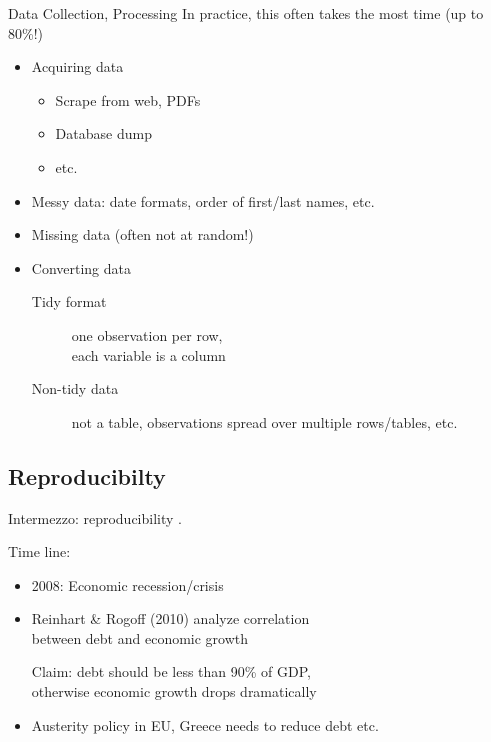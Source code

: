 \documentclass[aspectratio=169,usenames,dvipsnames]{beamer}
\begin{document}
\begin{frame}{Data Collection, Processing}
In practice, this often takes the most time (up to 80\%!)

\begin{itemize}
    \item Acquiring data
        \begin{itemize}
            \item Scrape from web, PDFs
            \item Database dump
            \item etc.
        \end{itemize}
    \pause
    \item Messy data: date formats, order of first/last names, etc.
    \item Missing data (often not at random!)
    \pause
    \item Converting data
        \begin{description}
            \item[Tidy format] one observation per row, \\
                    each variable is a column
            \item[Non-tidy data] not a table, observations spread over multiple
                rows/tables, etc.
        \end{description}
\end{itemize}
\end{frame}




\subsection{Reproducibilty}
\frame{\tableofcontents[currentsubsection]}

\begin{frame}{Intermezzo: reproducibility}
    .

    Time line:
    \begin{itemize}
        \item 2008: Economic recession/crisis
        \item Reinhart \& Rogoff (2010) analyze correlation \\
            between debt and economic growth \\
            \begin{block}{Claim:}
            debt should be less than 90\% of GDP, \\
                otherwise economic growth drops dramatically
            \end{block}
        \item Austerity policy in EU, Greece needs to reduce debt etc.
    \end{itemize}
\end{frame}
\end{document}
